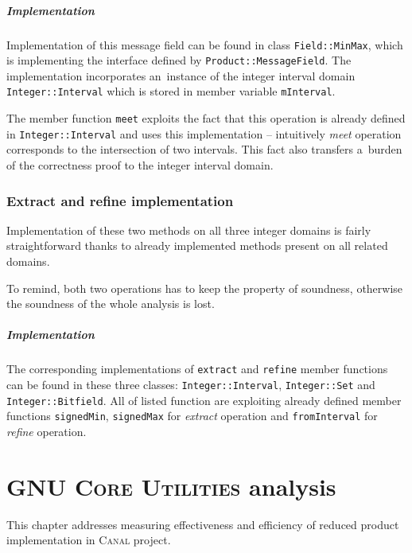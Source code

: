 \documentclass[12pt,oneside]{fithesis2}
\theoremstyle{definition}
\begin{document}
\paragraph{Implementation}
Implementation of this message field can be found in class \texttt{Field::MinMax}, which is implementing the interface defined by \texttt{Product::MessageField}. The implementation incorporates an~instance of the integer interval domain \texttt{Integer::Interval} which is stored in member variable \texttt{mInterval}.

The member function \texttt{meet} exploits the fact that this operation is already defined in \texttt{Integer::Interval} and uses this implementation -- intuitively \textit{meet} operation corresponds to the intersection of two intervals. This fact also transfers a~burden of the correctness proof to the integer interval domain.

\subsection{Extract and refine implementation}

Implementation of these two methods on all three integer domains is fairly straightforward thanks to already implemented methods present on all related domains.

To remind, both two operations has to keep the property of soundness, otherwise the soundness of the whole analysis is lost.

\paragraph{Implementation}
The corresponding implementations of \texttt{extract} and \texttt{refine} member functions can be found in these three classes: \texttt{Integer::Interval}, \texttt{Integer::Set} and \texttt{Integer::Bitfield}. All of listed function are exploiting already defined member functions \texttt{signedMin}, \texttt{signedMax} for \textit{extract} operation and \texttt{fromInterval} for \textit{refine} operation.

\chapter{\textsc{GNU Core Utilities} analysis}\label{ch:measurements}

This chapter addresses measuring effectiveness and efficiency of reduced product implementation in \textsc{Canal} project.
\end{document}
